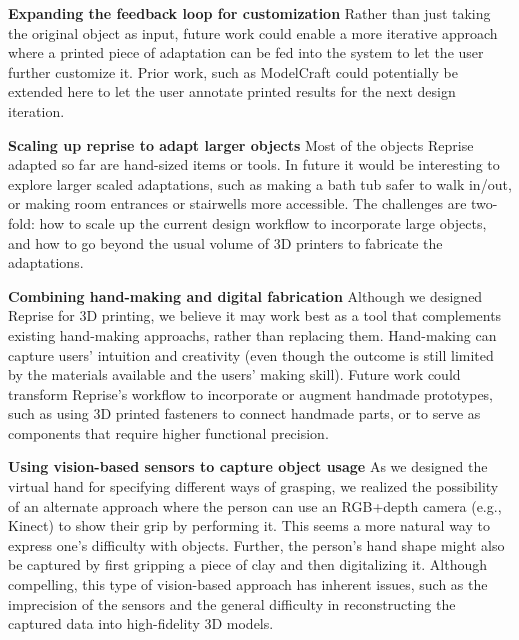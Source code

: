 \textbf{Expanding the feedback loop for customization}
Rather than just taking the original object as input, future work could enable a more iterative approach where a printed piece of adaptation can be fed into the system to let the user further customize it. Prior work, such as ModelCraft \cite{song2006modelcraft} could potentially be extended here to let the user annotate printed results for the next design iteration.

\textbf{Scaling up reprise to adapt larger objects}
Most of the objects Reprise adapted so far are hand-sized items or tools. In future it would be interesting to explore larger scaled adaptations, such as making a bath tub safer to walk in/out, or making room entrances or stairwells more accessible. The challenges are two-fold: how to scale up the current design workflow to incorporate large objects, and how to go beyond the usual volume of 3D printers to fabricate the adaptations.


\textbf{Combining hand-making and digital fabrication}
Although we designed Reprise for 3D printing, we believe it may work best as a tool that complements existing hand-making approachs, rather than replacing them. Hand-making can capture users' intuition and creativity (even though the outcome is still limited by the materials available and the users' making skill). Future work could transform Reprise's workflow to incorporate or augment handmade prototypes, such as using 3D printed fasteners to connect handmade parts, or to serve as components that require higher functional precision.

\textbf{Using vision-based sensors to capture object usage}
As we designed the virtual hand for specifying different ways of grasping, we realized the possibility of an alternate approach where the person can use an RGB+depth camera (e.g., Kinect) to show their grip by performing it. This seems a more natural way to express one's difficulty with objects. Further, the person's hand shape might also be captured by first gripping a piece of clay \cite{buehler2014coming} and then digitalizing it. Although compelling, this type of vision-based approach has inherent issues, such as the imprecision of the sensors and the general difficulty in reconstructing the captured data into high-fidelity 3D models.

